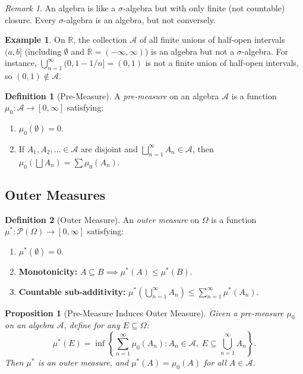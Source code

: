 \documentclass[11pt,a4paper]{article}
\theoremstyle{definition}
\newtheorem{definition}{Definition}[section]
\newtheorem{example}{Example}[section]
\theoremstyle{plain}
\newtheorem{proposition}[theorem]{Proposition}
\theoremstyle{remark}
\newtheorem{remark}{Remark}[section]
\newcommand{\R}{\mathbb{R}}
\newcommand{\powerset}{\mathcal{P}}
\begin{document}
\begin{remark}
An algebra is like a $\sigma$-algebra but with only finite (not countable) closure.
Every $\sigma$-algebra is an algebra, but not conversely.
\end{remark}

\begin{example}
\label{ex:algebra}
On $\R$, the collection $\mathcal{A}$ of all finite unions of half-open intervals
$(a, b]$ (including $\emptyset$ and $\R = (-\infty, \infty)$) is an algebra
but not a $\sigma$-algebra. For instance, $\bigcup_{n=1}^\infty (0, 1 - 1/n] = (0, 1)$
is not a finite union of half-open intervals, so $(0,1) \notin \mathcal{A}$.
\end{example}

\begin{definition}[Pre-Measure]
\label{def:premeasure}
A \emph{pre-measure} on an algebra $\mathcal{A}$ is a function
$\mu_0: \mathcal{A} \to [0, \infty]$ satisfying:
\begin{enumerate}[nosep,label=(\roman*)]
    \item $\mu_0(\emptyset) = 0$.
    \item If $A_1, A_2, \ldots \in \mathcal{A}$ are disjoint and
    $\bigsqcup_{n=1}^\infty A_n \in \mathcal{A}$, then
    $\mu_0(\bigsqcup A_n) = \sum \mu_0(A_n)$.
\end{enumerate}
\end{definition}

\subsection{Outer Measures}
\label{subsec:outer}

\begin{definition}[Outer Measure]
\label{def:outer}
An \emph{outer measure} on $\Omega$ is a function
$\mu^*: \powerset(\Omega) \to [0, \infty]$ satisfying:
\begin{enumerate}[nosep,label=(\roman*)]
    \item $\mu^*(\emptyset) = 0$.
    \item \textbf{Monotonicity:} $A \subseteq B \implies \mu^*(A) \leq \mu^*(B)$.
    \item \textbf{Countable sub-additivity:} $\mu^*(\bigcup_{n=1}^\infty A_n) \leq \sum_{n=1}^\infty \mu^*(A_n)$.
\end{enumerate}
\end{definition}

\begin{proposition}[Pre-Measure Induces Outer Measure]
\label{prop:induced_outer}
Given a pre-measure $\mu_0$ on an algebra $\mathcal{A}$, define for any
$E \subseteq \Omega$:
\begin{equation}
    \mu^*(E) = \inf\left\{\sum_{n=1}^\infty \mu_0(A_n) : A_n \in \mathcal{A},\; E \subseteq \bigcup_{n=1}^\infty A_n\right\}.
    \label{eq:induced_outer}
\end{equation}
Then $\mu^*$ is an outer measure, and $\mu^*(A) = \mu_0(A)$ for all $A \in \mathcal{A}$.
\end{proposition}
\end{document}
